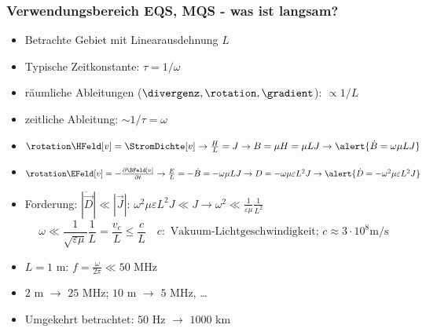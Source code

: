 \begin{frame}
  \frametitle{Verwendungsbereich EQS, MQS - was ist langsam?}
  \begin{itemize}[<+->]
  \item Betrachte Gebiet mit \alert{Linearausdehnung} $L$
  \item Typische \alert{Zeitkonstante}: $\tau = 1/\omega$
  \item räumliche Ableitungen ($\divergenz, \rotation, \gradient$): $\propto 1/L$
  \item zeitliche Ableitung: $\sim 1 /\tau = \omega$
  \item $\rotation \HFeld[v]  = \StromDichte[v] \to \frac{H}{L} = J \to B  = \mu H = \mu L J \to \alert{\dot{B}  =  \omega \mu L J}$
  \item $\rotation \EFeld[v]  = -\frac{\partial \BFeld[v]}{\partial t} \to \frac{E}{L} = - \dot{B} = - \omega \mu L J \to D = - \omega \mu\varepsilon L^2 J \to \alert{\dot{D} = - \omega^2 \mu\varepsilon L^2 J}$
  \item Forderung: $|\dot{\vec{D}}| \ll |\vec{J}|$: $\omega^2 \mu\varepsilon L^2 J \ll J \to \omega^2 \ll \frac{1}{\varepsilon \mu} \frac{1}{L^2}$
    $$
    \boxed{\omega \ll \frac{1}{\sqrt{\varepsilon \mu}} \frac{1}{L}} = \frac{v_c}{L} \le \frac{c}{L} \quad c: \text{ Vakuum-Lichtgeschwindigkeit; } c\approx 3\cdot 10^8 \text{m/s}
    $$
  \item $L=1$ m: $f=\frac{\omega}{2\pi} \ll 50$ MHz
  \item $2$ m $\to$ $25$ MHz; $10$ m $\to$ $5$ MHz, \dots
    \item Umgekehrt betrachtet: $50$ Hz $\to$ $1000$ km
  \end{itemize}
\end{frame}




   
